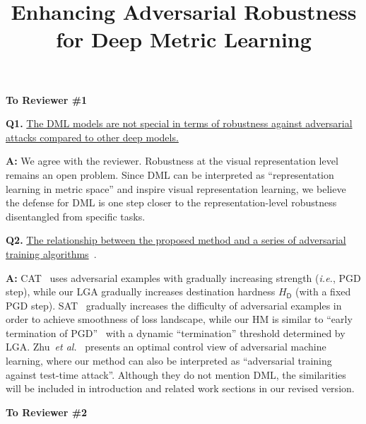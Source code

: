 \documentclass[10pt,twocolumn,letterpaper]{article}
\begin{document}
\title{Enhancing Adversarial Robustness for Deep Metric Learning}  %

\maketitle
\thispagestyle{empty}
\appendix

\noindent\textbf{To Reviewer \#1}
\vspace{0.2em}

\noindent\textbf{Q1.}
%
\ul{
The DML models are not special in terms of robustness against
adversarial attacks compared to other deep models.
}

\noindent\textbf{A:} 
%
We agree with the reviewer. Robustness at the visual representation level
remains an open problem. Since DML can be interpreted as ``representation
learning in metric space'' and inspire visual representation learning, we
believe the defense for DML is one step closer to the representation-level
robustness disentangled from specific tasks.

\noindent\textbf{Q2.}
%
\ul{
The relationship between the proposed method and a series of
adversarial training algorithms}~\cite{smoothat,currat,optcontrolaml}.

\noindent\textbf{A:}
%
CAT~\cite{currat} uses adversarial examples with gradually increasing strength
(\emph{i.e.}, PGD step), while our LGA gradually increases destination hardness
$H_\mathsf{D}$ (with a fixed PGD step).
%
SAT~\cite{smoothat} gradually increases the difficulty of adversarial examples
in order to achieve smoothness of loss landscape, while our HM is similar to
``early termination of PGD''~\cite{smoothat} with a dynamic ``termination''
threshold determined by LGA.
%
Zhu~\emph{et al.}~\cite{optcontrolaml} presents an optimal control view of
adversarial machine learning, where our method can also be interpreted as
``adversarial training against test-time attack''.
%
Although they do not mention DML, the similarities will be included in
introduction and related work sections in our revised version.


\vspace{0.3em}
\noindent\textbf{To Reviewer \#2}
\vspace{0.2em}
\end{document}
